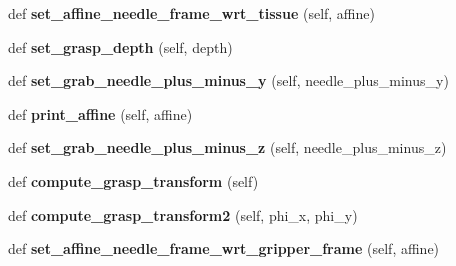 \begin{DoxyCompactItemize}
\item 
def {\bfseries set\+\_\+affine\+\_\+needle\+\_\+frame\+\_\+wrt\+\_\+tissue} (self, affine)\hypertarget{classneedle__planner_1_1needle__planner_ab403d517d27ff5209655b051a13f4124}{}\label{classneedle__planner_1_1needle__planner_ab403d517d27ff5209655b051a13f4124}

\item 
def {\bfseries set\+\_\+grasp\+\_\+depth} (self, depth)\hypertarget{classneedle__planner_1_1needle__planner_a165b39b11a60bc0636b3dfef727a28c6}{}\label{classneedle__planner_1_1needle__planner_a165b39b11a60bc0636b3dfef727a28c6}

\item 
def {\bfseries set\+\_\+grab\+\_\+needle\+\_\+plus\+\_\+minus\+\_\+y} (self, needle\+\_\+plus\+\_\+minus\+\_\+y)\hypertarget{classneedle__planner_1_1needle__planner_a1543a6ec6f9b9cbb1cc83c059bfe7931}{}\label{classneedle__planner_1_1needle__planner_a1543a6ec6f9b9cbb1cc83c059bfe7931}

\item 
def {\bfseries print\+\_\+affine} (self, affine)\hypertarget{classneedle__planner_1_1needle__planner_a7bbad490fe7cd4ce836c4baa71a29348}{}\label{classneedle__planner_1_1needle__planner_a7bbad490fe7cd4ce836c4baa71a29348}

\item 
def {\bfseries set\+\_\+grab\+\_\+needle\+\_\+plus\+\_\+minus\+\_\+z} (self, needle\+\_\+plus\+\_\+minus\+\_\+z)\hypertarget{classneedle__planner_1_1needle__planner_af286fada7b5d81ee3126d8a4b3f57674}{}\label{classneedle__planner_1_1needle__planner_af286fada7b5d81ee3126d8a4b3f57674}

\item 
def {\bfseries compute\+\_\+grasp\+\_\+transform} (self)\hypertarget{classneedle__planner_1_1needle__planner_adafeae6efda509ebf7eb54ebd30cf6a4}{}\label{classneedle__planner_1_1needle__planner_adafeae6efda509ebf7eb54ebd30cf6a4}

\item 
def {\bfseries compute\+\_\+grasp\+\_\+transform2} (self, phi\+\_\+x, phi\+\_\+y)\hypertarget{classneedle__planner_1_1needle__planner_a390f3df0b63cc74affff7075348841d2}{}\label{classneedle__planner_1_1needle__planner_a390f3df0b63cc74affff7075348841d2}

\item 
def {\bfseries set\+\_\+affine\+\_\+needle\+\_\+frame\+\_\+wrt\+\_\+gripper\+\_\+frame} (self, affine)\hypertarget{classneedle__planner_1_1needle__planner_a935d745ee8b0eb115fc40a8fcdc8a9b8}{}\label{classneedle__planner_1_1needle__planner_a935d745ee8b0eb115fc40a8fcdc8a9b8}


\end{DoxyCompactItemize}
